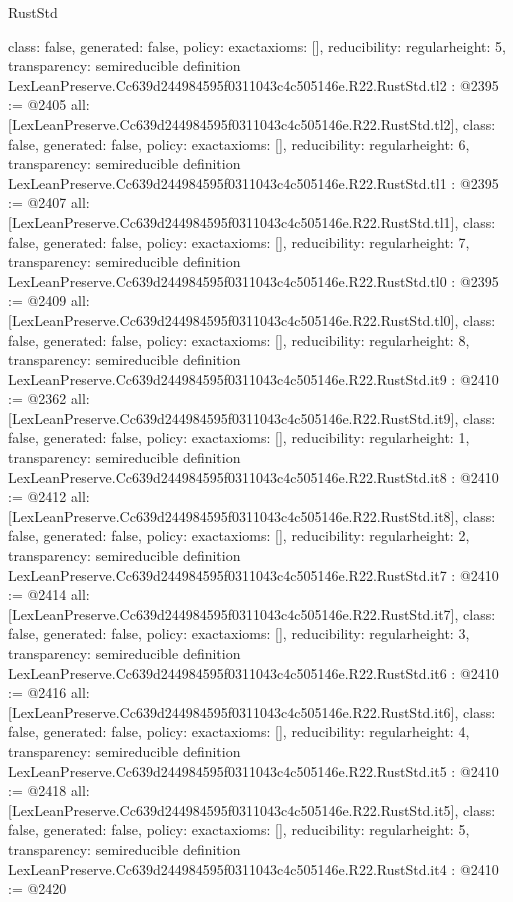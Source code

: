 \begin{lexlean}{RustStd}
\begin{coremodule}
{  class: false,
  generated: false,
  policy: exact{axioms: []},
  reducibility: regular{height: 5},
  transparency: semireducible
}
definition LexLeanPreserve.Cc639d244984595f0311043c4c505146e.R22.RustStd.tl2 : @2395 := @2405 {
  all: [LexLeanPreserve.Cc639d244984595f0311043c4c505146e.R22.RustStd.tl2],
  class: false,
  generated: false,
  policy: exact{axioms: []},
  reducibility: regular{height: 6},
  transparency: semireducible
}
definition LexLeanPreserve.Cc639d244984595f0311043c4c505146e.R22.RustStd.tl1 : @2395 := @2407 {
  all: [LexLeanPreserve.Cc639d244984595f0311043c4c505146e.R22.RustStd.tl1],
  class: false,
  generated: false,
  policy: exact{axioms: []},
  reducibility: regular{height: 7},
  transparency: semireducible
}
definition LexLeanPreserve.Cc639d244984595f0311043c4c505146e.R22.RustStd.tl0 : @2395 := @2409 {
  all: [LexLeanPreserve.Cc639d244984595f0311043c4c505146e.R22.RustStd.tl0],
  class: false,
  generated: false,
  policy: exact{axioms: []},
  reducibility: regular{height: 8},
  transparency: semireducible
}
definition LexLeanPreserve.Cc639d244984595f0311043c4c505146e.R22.RustStd.it9 : @2410 := @2362 {
  all: [LexLeanPreserve.Cc639d244984595f0311043c4c505146e.R22.RustStd.it9],
  class: false,
  generated: false,
  policy: exact{axioms: []},
  reducibility: regular{height: 1},
  transparency: semireducible
}
definition LexLeanPreserve.Cc639d244984595f0311043c4c505146e.R22.RustStd.it8 : @2410 := @2412 {
  all: [LexLeanPreserve.Cc639d244984595f0311043c4c505146e.R22.RustStd.it8],
  class: false,
  generated: false,
  policy: exact{axioms: []},
  reducibility: regular{height: 2},
  transparency: semireducible
}
definition LexLeanPreserve.Cc639d244984595f0311043c4c505146e.R22.RustStd.it7 : @2410 := @2414 {
  all: [LexLeanPreserve.Cc639d244984595f0311043c4c505146e.R22.RustStd.it7],
  class: false,
  generated: false,
  policy: exact{axioms: []},
  reducibility: regular{height: 3},
  transparency: semireducible
}
definition LexLeanPreserve.Cc639d244984595f0311043c4c505146e.R22.RustStd.it6 : @2410 := @2416 {
  all: [LexLeanPreserve.Cc639d244984595f0311043c4c505146e.R22.RustStd.it6],
  class: false,
  generated: false,
  policy: exact{axioms: []},
  reducibility: regular{height: 4},
  transparency: semireducible
}
definition LexLeanPreserve.Cc639d244984595f0311043c4c505146e.R22.RustStd.it5 : @2410 := @2418 {
  all: [LexLeanPreserve.Cc639d244984595f0311043c4c505146e.R22.RustStd.it5],
  class: false,
  generated: false,
  policy: exact{axioms: []},
  reducibility: regular{height: 5},
  transparency: semireducible
}
definition LexLeanPreserve.Cc639d244984595f0311043c4c505146e.R22.RustStd.it4 : @2410 := @2420 {
}
\end{coremodule}
\end{lexlean}
